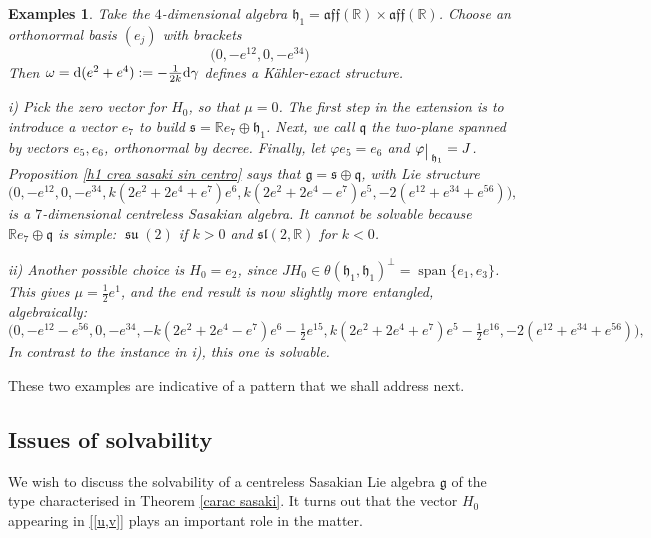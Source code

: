 \documentclass[12pt, twoside]{amsart}
\def\D{\textup{d}}
\def\g{\mathfrak{g}}
\def\h{\mathfrak{h}}
\def\q{\mathfrak{q}}
\def\s{\mathfrak s}
\def\R{\mathbb{R}}
\newcommand{\lie}[1]{\mathfrak{#1}}
\DeclareMathOperator{\su}{\lie{su}}
\def\aff{\mathfrak{aff}}
\newcommand{\op}[1]{\operatorname{#1}}
\newcommand{\restr}{\raisebox{-.2em}{$\!\big\arrowvert$}}
\newtheorem{examples}[definition]{\bf Examples}
\theoremstyle{definition}
\begin{document}
\begin{examples}
{\rm Take the $4$-dimensional algebra $ \h_1=\aff(\R) \times \aff(\R)$. Choose an orthonormal basis  $(e_j)$ with brackets
$$\big(0,-e^{12},0,-e^{34}\big)$$
Then $\omega =\D(e^{2}+e^{4}):=-\frac 1{2k}\D\gamma$ defines a K{\"a}hler-exact structure.\par 
\quad i) Pick the zero vector for $H_0$, so that $\mu =0$. The first step  in the extension is to introduce a vector $e_7$ to build $\s=\R e_7 \oplus \h_1 $. Next, we call ${\q}$ the two-plane spanned by vectors $e_5, e_6$, orthonormal by decree. Finally, let $\varphi e_5=e_6$ and  $\varphi\restr_{\h_1}=J$. 
Proposition \ref{h1 crea sasaki sin centro} says that  $\g=\s \oplus {\q}$, with Lie structure
$$\big(0,-e^{12},0,-e^{34}, 
  k (2 e^{2} +2 e ^{4}+e^{7}) e^{6}, k (2 e^{2} +2 e^{4}-e^{7}) e^{5}, 
 -2 (e ^{12}+e^{34}+e^{56}) 
\big),$$
is a $7$-dimensional centreless Sasakian algebra. It cannot  be solvable because $\R e_7 \oplus {\q}$ is simple: $\su(2)$ if $k>0$ and $\mathfrak{sl}(2,\R)$ for $k<0$.\par
\quad ii) Another possible choice is $H_0=e_2$, since $JH_0 \in \theta(\h_1, \h_1)^\perp=\op{span}\{e_1,e_3\}$. This gives $\mu=\frac{1}{2}e^1$, and the end result is now slightly more entangled, algebraically: 
$$\big(0,  -e^{12}-e^{56}, 0, -e^{34}, 
 -k (2 e^{2} +2 e ^{4}-e^{7}) e^{6} -\tfrac{1}{2}e^{15}, 
 k (2 e^{2} +2 e^{4}+e^{7}) e^{5} -\tfrac{1}{2}e^{16}, 
 -2(e^{12}+e^{34}+e^{56}) 
 \big),$$
In contrast to the instance in i), this one is solvable. }
\end{examples}
These two examples are indicative of a pattern that we shall address next. 

\bigbreak

\subsection{Issues of solvability} 
\medbreak

We wish to discuss the solvability of a centreless Sasakian Lie algebra $\g$ of the type characterised in Theorem \ref{carac sasaki}. 
 It turns out that the vector $H_0$ appearing in \eqref{[u,v]} plays an important role in the matter.
\end{document}
